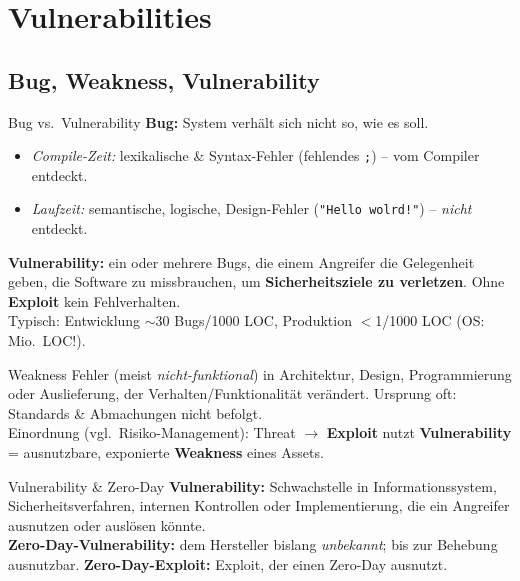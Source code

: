 \documentclass[a4paper, fontsize=7pt]{scrartcl}
\begin{document}
\section{Vulnerabilities}

\subsection{Bug, Weakness, Vulnerability}

\begin{mainbox}{Bug vs.\ Vulnerability}
\textbf{Bug:} System verhält sich nicht so, wie es soll.
\begin{itemize}
    \item \emph{Compile-Zeit:} lexikalische \& Syntax-Fehler (fehlendes
          \texttt{;}) -- vom Compiler entdeckt.
    \item \emph{Laufzeit:} semantische, logische, Design-Fehler
          (\texttt{"Hello wolrd!"}) -- \emph{nicht} entdeckt.
\end{itemize}
\textbf{Vulnerability:} ein oder mehrere Bugs, die einem Angreifer die
Gelegenheit geben, die Software zu missbrauchen, um
\textbf{Sicherheitsziele zu verletzen}. Ohne \textbf{Exploit} kein
Fehlverhalten.\\
Typisch: Entwicklung $\sim$30 Bugs/1000 LOC, Produktion $<$1/1000 LOC
(OS: Mio.\ LOC!).
\end{mainbox}

\begin{mainbox}{Weakness}
Fehler (meist \emph{nicht-funktional}) in Architektur, Design,
Programmierung oder Auslieferung, der Verhalten/Funktionalität verändert.
Ursprung oft: Standards \& Abmachungen nicht befolgt.\\
Einordnung (vgl.\ Risiko-Management): Threat $\to$ \textbf{Exploit}
nutzt \textbf{Vulnerability} = ausnutzbare, exponierte
\textbf{Weakness} eines Assets.
\end{mainbox}

\begin{mainbox}{Vulnerability \& Zero-Day}
\textbf{Vulnerability:} Schwachstelle in Informationssystem,
Sicherheitsverfahren, internen Kontrollen oder Implementierung, die ein
Angreifer ausnutzen oder auslösen könnte.\\
\textbf{Zero-Day-Vulnerability:} dem Hersteller bislang
\emph{unbekannt}; bis zur Behebung ausnutzbar.
\textbf{Zero-Day-Exploit:} Exploit, der einen Zero-Day ausnutzt.
\end{mainbox}
\end{document}
